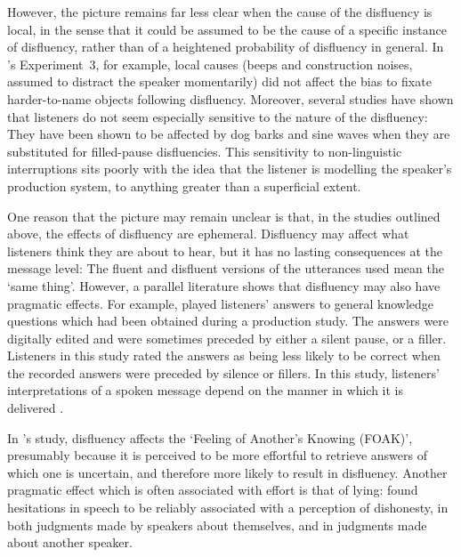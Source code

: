 \documentclass[a4paper,man,natbib]{apa6}
\begin{document}
However, the picture remains far less clear when the cause of the disfluency is local, in the sense that it could be assumed to be the cause of a specific instance of disfluency, rather than of a heightened probability of disfluency in general.
In \citeauthor{Arnold2007}'s Experiment~3, for example, local causes (beeps and construction noises, assumed to distract the speaker momentarily) did not affect the bias to fixate harder-to-name objects following disfluency.
Moreover, several studies have shown that listeners do not seem especially sensitive to the nature of the disfluency:  They have been shown to be affected by dog barks \citep{bailey2003disfluencies} and sine waves \citep{corley2011helps} when they are substituted for filled-pause disfluencies.
This sensitivity to non-linguistic interruptions sits poorly with the idea that the listener is modelling the speaker's production system, to anything greater than a superficial extent.

One reason that the picture may remain unclear is that, in the studies outlined above, the effects of disfluency are ephemeral.
Disfluency may affect what listeners think they are about to hear, but it has no lasting consequences at the message level:  The fluent and disfluent versions of the utterances used mean the `same thing'.
However, a parallel literature shows that disfluency may also have pragmatic effects.
%
For example, \citet{Brennan1995} played listeners' answers to general knowledge questions which had been obtained during a production study.
The answers were digitally edited and were sometimes preceded by either a silent pause, or a filler.
Listeners in this study rated the answers as being less likely to be correct when the recorded answers were preceded by silence or fillers.
In this study, listeners' interpretations of a spoken message depend on the manner in which it is delivered \citep[see also][]{Swerts2005}.

In \citeauthor{Brennan1995}'s study, disfluency affects the `Feeling of Another's Knowing (FOAK)', presumably because it is perceived to be more effortful to retrieve answers of which one is uncertain, and therefore more likely to result in disfluency.
Another pragmatic effect which is often associated with effort is that of lying: \citet{Zuckerman1981} found hesitations in speech to be reliably associated with a perception of dishonesty, in both judgments made by speakers about themselves, and in judgments made about another speaker. 








\end{document}
